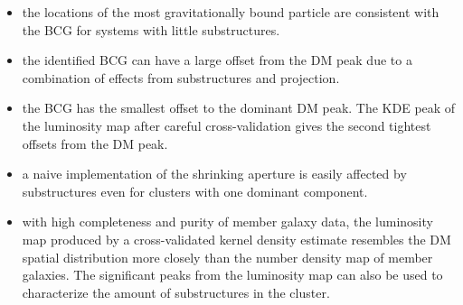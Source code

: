 \begin{itemize}
		\item the locations of the most gravitationally bound particle are consistent 
			with the BCG for systems with little substructures.  \\

		\item the identified BCG can have a large offset from the DM peak due to a
			combination of effects from substructures and projection. \\

		\item the BCG has the smallest offset to the dominant DM peak.  
			The KDE peak of the luminosity map after careful cross-validation 
			gives the second tightest offsets from the DM peak.  \\
		
		\item a naive implementation of the shrinking aperture is easily affected 
			by substructures even for clusters with one
			dominant component. \\  

		\item with high completeness and purity of member galaxy data, the
			luminosity map produced by a cross-validated kernel density estimate 
			resembles the DM spatial distribution more closely than 
			the number density map of member galaxies. The significant peaks from the 
			luminosity map can also be used to characterize the amount of substructures in
			the cluster.\\ 
		

	
\end{itemize}


